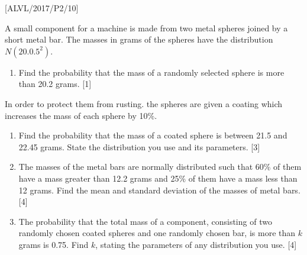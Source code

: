 \item {[}ALVL/2017/P2/10{]}

A small component for a machine is made from two metal spheres joined
by a short metal bar. The masses in grams of the spheres have the
distribution $N\left(20.0.5^{2}\right)$.
\begin{enumerate}
\item Find the probability that the mass of a randomly selected sphere is
more than 20.2 grams.\hfill{} {[}1{]}
\end{enumerate}
In order to protect them from rusting. the spheres are given a coating
which increases the mass of each sphere by 10\%.
\begin{enumerate}
\item Find the probability that the mass of a coated sphere is between 21.5
and 22.45 grams. State the distribution you use and its parameters.
\hfill{}{[}3{]}
\item The masses of the metal bars are normally distributed such that 60\%
of them have a mass greater than 12.2 grams and 25\% of them have
a mass less than 12 grams. Find the mean and standard deviation of
the masses of metal bars. \hfill{}{[}4{]}
\item The probability that the total mass of a component, consisting of
two randomly chosen coated spheres and one randomly chosen bar, is
more than $k$ grams is 0.75. Find $k$, stating the parameters of
any distribution you use. \hfill{}{[}4{]}
\end{enumerate}
